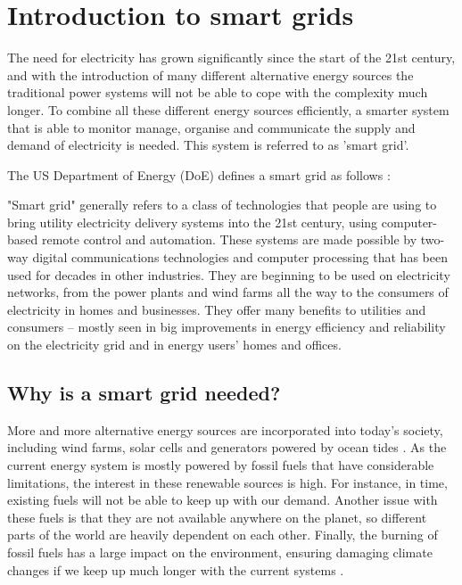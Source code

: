\section{Introduction to smart grids}
The need for electricity has grown significantly since the start of the 21st century, and with the introduction of many different alternative energy sources the traditional power systems will not be able to cope with the complexity much longer. To combine all these different energy sources efficiently, a smarter system that is able to monitor manage, organise and communicate the supply and demand of electricity is needed. This system is referred to as 'smart grid'. 

The US Department of Energy (DoE) defines a smart grid as follows \cite{doe}:
\begin{displayquote}
"Smart grid" generally refers to a class of technologies that people are using to bring utility electricity delivery systems into the 21st century, using computer-based remote control and automation. These systems are made possible by two-way digital communications technologies and computer processing that has been used for decades in other industries. They are beginning to be used on electricity networks, from the power plants and wind farms all the way to the consumers of electricity in homes and businesses. They offer many benefits to utilities and consumers -- mostly seen in big improvements in energy efficiency and reliability on the electricity grid and in energy users' homes and offices.
\end{displayquote}

\subsection{Why is a smart grid needed?}

More and more alternative energy sources are incorporated into today's society, including wind farms, solar cells and generators powered by ocean tides \cite{Tromly2001}. As the current energy system is mostly powered by fossil fuels that have considerable limitations, the interest in these renewable sources is high. For instance, in time, existing fuels will not be able to keep up with our demand. Another issue with these fuels is that they are not available anywhere on the planet, so different parts of the world are heavily dependent on each other. Finally, the burning of fossil fuels has a large impact on the environment, ensuring damaging  climate changes if we keep up much longer with the current systems \cite{friedman2008hot}. 


